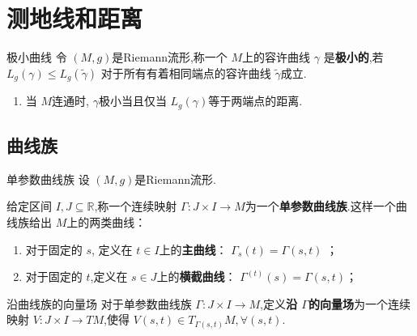\documentclass[../../几何与拓扑.tex]{subfiles}
\begin{document}
 
\ifSubfilesClassLoaded{
    \frontmatter

    \tableofcontents
    
    \mainmatter
}{}

\chapter{测地线和距离}

\begin{definition}{极小曲线}
    令 \(  \left( M,g \right)   \)是Riemann流形,称一个 \(  M  \)上的容许曲线 \(   \gamma   \)   是\textbf{极小的},若 \(  L_{g}\left(  \gamma  \right)\le L_{g}\left(  \tilde{\gamma}  \right)    \) 对于所有有着相同端点的容许曲线 \(   \tilde{\gamma}   \)成立. 
\end{definition}

\begin{remark}
    \begin{enumerate}
        \item 当 \(  M  \)连通时, \(   \gamma   \)极小当且仅当 \(  L_{g}\left(  \gamma  \right)  \)等于两端点的距离.   
    \end{enumerate}
    
\end{remark}

\section{曲线族}

\begin{definition}{单参数曲线族}
    设 \(  \left( M,g \right)   \)是Riemann流形.
    
    给定区间 \(  I,J\subseteq \mathbb{R}   \),称一个连续映射 \(   \Gamma :J\times I\to M  \)为一个\textbf{单参数曲线族}.这样一个曲线族给出 \(  M  \)上的两类曲线：
    \begin{enumerate}
        \item 对于固定的 \(  s  \), 定义在 \(  t \in I  \)上的\textbf{主曲线}： \(   \Gamma _{s}\left( t \right)=  \Gamma \left( s,t \right)    \) ；
        \item 对于固定的 \(  t  \),定义在 \(  s \in J  \)上的\textbf{横截曲线}： \(   \Gamma ^{\left( t \right) }\left( s \right)=  \Gamma \left( s,t \right)    \)；
    \end{enumerate}
       
\end{definition}

\begin{definition}{沿曲线族的向量场}
    对于单参数曲线族 \(   \Gamma :J\times I\to M  \),定义\textbf{沿 \(   \Gamma   \)的向量场}为一个连续映射 \(  V: J\times I\to TM  \),使得 \(  V\left( s,t \right)\in T_{ \Gamma \left( s,t \right) }M,\forall \left( s,t \right)    \).   
\end{definition}
\end{document}
